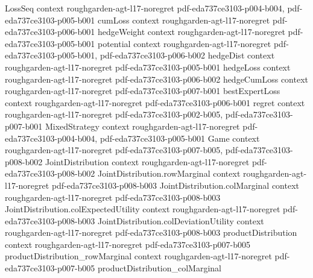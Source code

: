 \begin{lemma}
\label{empiricalJoint_col_deviation_le}
\leanok
{}
\proofstep
  {LossSeq}
  {context}
  {roughgarden-agt-l17-noregret}
  {pdf-eda737ce3103-p004-b004,
    pdf-eda737ce3103-p005-b001}
\proofstep
  {cumLoss}
  {context}
  {roughgarden-agt-l17-noregret}
  {pdf-eda737ce3103-p006-b001}
\proofstep
  {hedgeWeight}
  {context}
  {roughgarden-agt-l17-noregret}
  {pdf-eda737ce3103-p005-b001}
\proofstep
  {potential}
  {context}
  {roughgarden-agt-l17-noregret}
  {pdf-eda737ce3103-p005-b001,
    pdf-eda737ce3103-p006-b002}
\proofstep
  {hedgeDist}
  {context}
  {roughgarden-agt-l17-noregret}
  {pdf-eda737ce3103-p005-b001}
\proofstep
  {hedgeLoss}
  {context}
  {roughgarden-agt-l17-noregret}
  {pdf-eda737ce3103-p006-b002}
\proofstep
  {hedgeCumLoss}
  {context}
  {roughgarden-agt-l17-noregret}
  {pdf-eda737ce3103-p007-b001}
\proofstep
  {bestExpertLoss}
  {context}
  {roughgarden-agt-l17-noregret}
  {pdf-eda737ce3103-p006-b001}
\proofstep
  {regret}
  {context}
  {roughgarden-agt-l17-noregret}
  {pdf-eda737ce3103-p002-b005,
    pdf-eda737ce3103-p007-b001}
\proofstep
  {MixedStrategy}
  {context}
  {roughgarden-agt-l17-noregret}
  {pdf-eda737ce3103-p004-b004,
    pdf-eda737ce3103-p005-b001}
\proofstep
  {Game}
  {context}
  {roughgarden-agt-l17-noregret}
  {pdf-eda737ce3103-p007-b005,
    pdf-eda737ce3103-p008-b002}
\proofstep
  {JointDistribution}
  {context}
  {roughgarden-agt-l17-noregret}
  {pdf-eda737ce3103-p008-b002}
\proofstep
  {JointDistribution.rowMarginal}
  {context}
  {roughgarden-agt-l17-noregret}
  {pdf-eda737ce3103-p008-b003}
\proofstep
  {JointDistribution.colMarginal}
  {context}
  {roughgarden-agt-l17-noregret}
  {pdf-eda737ce3103-p008-b003}
\proofstep
  {JointDistribution.colExpectedUtility}
  {context}
  {roughgarden-agt-l17-noregret}
  {pdf-eda737ce3103-p008-b003}
\proofstep
  {JointDistribution.colDeviationUtility}
  {context}
  {roughgarden-agt-l17-noregret}
  {pdf-eda737ce3103-p008-b003}
\proofstep
  {productDistribution}
  {context}
  {roughgarden-agt-l17-noregret}
  {pdf-eda737ce3103-p007-b005}
\proofstep
  {productDistribution_rowMarginal}
  {context}
  {roughgarden-agt-l17-noregret}
  {pdf-eda737ce3103-p007-b005}
\proofstep
  {productDistribution_colMarginal}

\end{lemma}
